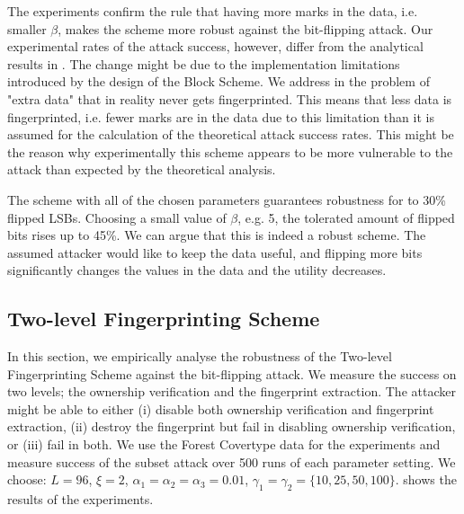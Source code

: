 The experiments confirm the rule that having more marks in the data, i.e. smaller $\beta$, makes the scheme more robust against the bit-flipping attack.
Our experimental rates of the attack success, however, differ from the analytical results in . 
The change might be due to the implementation limitations introduced by the design of the Block Scheme. 
We address in  the problem of "extra data" that in reality never gets fingerprinted.
This means that less data is fingerprinted, i.e. fewer marks are in the data due to this limitation than it is assumed for the calculation of the theoretical attack success rates.
This might be the reason why experimentally this scheme appears to be more vulnerable to the attack than expected by the theoretical analysis.

The scheme with all of the chosen parameters guarantees robustness for to 30\% flipped LSBs. Choosing a small value of $\beta$, e.g. 5, the tolerated amount of flipped bits rises up to 45\%.
We can argue that this is indeed a robust scheme. The assumed attacker would like to keep the data useful, and flipping more bits significantly changes the values in the data and the utility decreases.


\subsection{Two-level Fingerprinting Scheme}
In this section, we empirically analyse the robustness of the Two-level Fingerprinting Scheme against the bit-flipping attack. 
We measure the success on two levels; the ownership verification and the fingerprint extraction.
The attacker might be able to either (i) disable both ownership verification and fingerprint extraction, (ii) destroy the fingerprint but fail in disabling ownership verification, or (iii) fail in both. 
We use the Forest Covertype data for the experiments and measure success of the subset attack over 500 runs of each parameter setting. We choose: $L=96$, $\xi=2$, $\alpha_1=\alpha_2=\alpha_3=0.01$, $\gamma_1=\gamma_2=\{10,25,50,100\}$.
 shows the results of the experiments.

